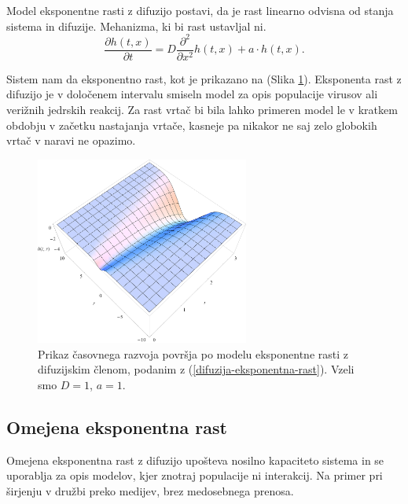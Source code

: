 \documentclass[a4paper, twoside, 12pt]{book}
\begin{document}
Model eksponentne rasti z difuzijo postavi, da je rast linearno odvisna od stanja sistema in difuzije. Mehanizma, ki bi rast ustavljal ni.
    \begin{equation}
      \frac{ \partial h(t,x) }{ \partial t} = D \frac{\partial^2}{\partial x^2} h(t,x) + a \cdot h(t,x).
      \label{difuzija-eksponentna-rast}
    \end{equation}

Sistem nam da eksponentno rast, kot je prikazano na (Slika \ref{fig:difuzija-eksponentna-rast}).
Eksponenta rast z difuzijo je v določenem intervalu smiseln model za opis populacije virusov ali verižnih jedrskih reakcij. Za rast vrtač bi bila lahko primeren model le v kratkem obdobju v začetku nastajanja vrtače, kasneje pa nikakor ne saj zelo globokih vrtač v naravi ne opazimo.
    \begin{figure}[h!]
      \begin{center}
        \includegraphics[width=7cm]{slike/difuzija-eksponentna-rast2}
      \end{center}
      \caption{Prikaz časovnega razvoja površja po modelu eksponentne rasti z difuzijskim členom, podanim z (\ref{difuzija-eksponentna-rast}). Vzeli smo $D=1$, $a=1$.}
      \label{fig:difuzija-eksponentna-rast}
    \end{figure}

\subsection{Omejena eksponentna rast}

    Omejena eksponentna rast z difuzijo upošteva nosilno kapaciteto sistema in se uporablja za opis modelov, kjer znotraj populacije ni interakcij. Na primer pri širjenju v družbi preko medijev, brez medosebnega prenosa.\\
\end{document}
